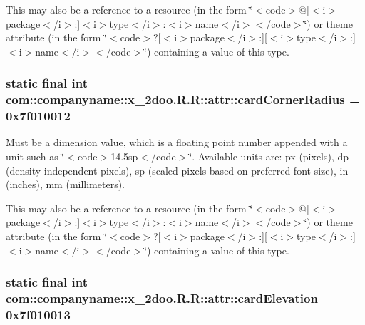 This may also be a reference to a resource (in the form \char`\"{}$<$code$>$@\mbox{[}$<$i$>$package$<$/i$>$:\mbox{]}$<$i$>$type$<$/i$>$:$<$i$>$name$<$/i$>$$<$/code$>$\char`\"{}) or theme attribute (in the form \char`\"{}$<$code$>$?\mbox{[}$<$i$>$package$<$/i$>$:\mbox{]}\mbox{[}$<$i$>$type$<$/i$>$:\mbox{]}$<$i$>$name$<$/i$>$$<$/code$>$\char`\"{}) containing a value of this type. \hypertarget{classcom_1_1companyname_1_1x__2doo_1_1_r_1_1attr_3782edf0ca4ffd7646880e53305c3a2e}{
\subsubsection[{cardCornerRadius}]{\setlength{\rightskip}{0pt plus 5cm}static final int com::companyname::x\_\-2doo.R.R::attr::cardCornerRadius = 0x7f010012}}
\label{classcom_1_1companyname_1_1x__2doo_1_1_r_1_1attr_3782edf0ca4ffd7646880e53305c3a2e}


Must be a dimension value, which is a floating point number appended with a unit such as \char`\"{}$<$code$>$14.5sp$<$/code$>$\char`\"{}. Available units are: px (pixels), dp (density-independent pixels), sp (scaled pixels based on preferred font size), in (inches), mm (millimeters). 

This may also be a reference to a resource (in the form \char`\"{}$<$code$>$@\mbox{[}$<$i$>$package$<$/i$>$:\mbox{]}$<$i$>$type$<$/i$>$:$<$i$>$name$<$/i$>$$<$/code$>$\char`\"{}) or theme attribute (in the form \char`\"{}$<$code$>$?\mbox{[}$<$i$>$package$<$/i$>$:\mbox{]}\mbox{[}$<$i$>$type$<$/i$>$:\mbox{]}$<$i$>$name$<$/i$>$$<$/code$>$\char`\"{}) containing a value of this type. \hypertarget{classcom_1_1companyname_1_1x__2doo_1_1_r_1_1attr_e99520caecdbbdc4aa696c11d209cce9}{
\subsubsection[{cardElevation}]{\setlength{\rightskip}{0pt plus 5cm}static final int com::companyname::x\_\-2doo.R.R::attr::cardElevation = 0x7f010013}}
\label{classcom_1_1companyname_1_1x__2doo_1_1_r_1_1attr_e99520caecdbbdc4aa696c11d209cce9}



